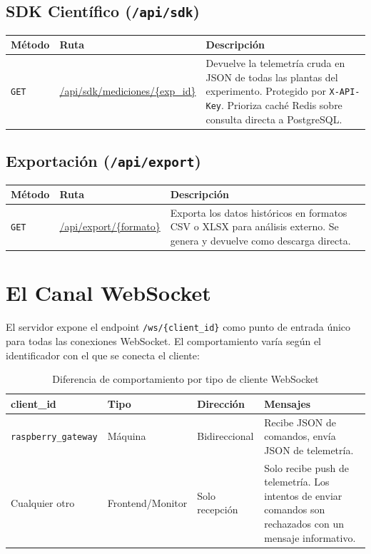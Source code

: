 \subsection{SDK Científico (\texttt{/api/sdk})}
\begin{table}[H]
    \centering
    \begin{tabularx}{\textwidth}{lXX}
        \toprule
        \textbf{Método} & \textbf{Ruta}                     & \textbf{Descripción} \\
        \midrule
        \texttt{GET}  & \url{/api/sdk/mediciones/{exp_id}} & Devuelve la telemetría cruda en JSON de todas las plantas del experimento. Protegido por \texttt{X-API-Key}. Prioriza caché Redis sobre consulta directa a PostgreSQL. \\
        \bottomrule
    \end{tabularx}
\end{table}

\subsection{Exportación (\texttt{/api/export})}
\begin{table}[H]
    \centering
    \begin{tabularx}{\textwidth}{lXX}
        \toprule
        \textbf{Método} & \textbf{Ruta}             & \textbf{Descripción} \\
        \midrule
        \texttt{GET}  & \url{/api/export/{formato}} & Exporta los datos históricos en formatos CSV o XLSX para análisis externo. Se genera y devuelve como descarga directa. \\
        \bottomrule
    \end{tabularx}
\end{table}


\section{El Canal WebSocket}

El servidor expone el endpoint \texttt{/ws/\{client\_id\}} como punto de entrada único para 
todas las conexiones WebSocket. El comportamiento varía según el identificador con el que 
se conecta el cliente:

\begin{table}[H]
    \centering
    \caption{Diferencia de comportamiento por tipo de cliente WebSocket}
    \begin{tabular}{lllp{5cm}}
        \toprule
        \textbf{client\_id}          & \textbf{Tipo}    & \textbf{Dirección} & \textbf{Mensajes} \\
        \midrule
        \texttt{raspberry\_gateway}  & Máquina          & Bidireccional      & Recibe JSON de comandos, envía JSON de telemetría. \\
        Cualquier otro               & Frontend/Monitor & Solo recepción     & Solo recibe push de telemetría. Los intentos de enviar comandos son rechazados con un mensaje informativo. \\
        \bottomrule
    \end{tabular}
\end{table}

